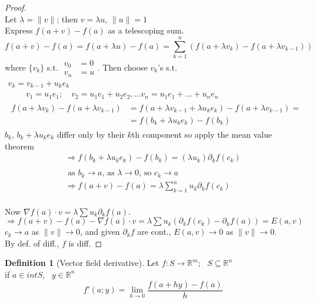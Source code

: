 \documentclass[twoside]{amsart}
\theoremstyle{plain}
\theoremstyle{definition}
\newtheorem{definition}{Definition}
\begin{document}
\begin{proof} \quad \\
Let $\lambda = \| v \|$; then $v = \lambda u$, \quad $\| u \| = 1$ \\
Express $f(a+v) -f(a)$ as a telescoping sum.  
\[
f(a+v)-f(a) = f(a + \lambda u ) -f(a) = \sum_{k=1}^n \left( f(a+\lambda v_k) - f(a+\lambda v_{k-1}) \right) 
\]
where $\{ v_k \}$ s.t. $  \begin{aligned}
    v_0 & = 0 \\
    v_n & = u 
  \end{aligned}$.  Then choose $v_k$'s s.t. 
\[
\begin{gathered}
  v_k = v_{k-1} + u_k e_k \\
 \quad \quad \, v_1 = u_1 e_1; \quad v_2 = u_1 e_1 + u_2 e_2 , \dots v_n = u_1 e_1 + \dots + u_n e_n  \\
  \begin{aligned}
f(a+\lambda v_k) - f(a+\lambda v_{k-1} )  & = f(a+ \lambda v_{k-1} + \lambda u_k e_k) - f(a+\lambda v_{k-1} ) = \\
& = f(b_k + \lambda u_k e_k) - f(b_k)
\end{aligned} 
\end{gathered}
\]
$b_k, \, b_k + \lambda u_k e_k$ differ only by their $k$th component so apply the mean value theorem 
\[
\begin{gathered}
  \Longrightarrow f(b_k + \lambda u_k e_k) - f(b_k) = (\lambda u_k) \partial_k f(c_k) \\
\quad \\
\text{ as $b_k \to a$, as $\lambda \to 0$, so $c_k \to a$ } \\
\Longrightarrow f(a+v) -f(a) = \lambda \sum_{k=1}^n u_k \partial_k f(c_k) 
\end{gathered}
\]
\quad \\
Now $\nabla f(a) \cdot v = \lambda \sum u_k \partial_k f(a) $.  \\
$\Longrightarrow f(a+v) -f(a) - \nabla f(a) \cdot v = \lambda \sum u_k (\partial_k f(c_k) - \partial_k f(a) ) = E(a,v)$ \medskip \\
$c_k \to a$ as $\| v \| \to 0$, and given $\partial_k f$ are cont., $E(a,v) \to 0$ as $\| v \| \to 0$.  \\
By def. of diff., $f$ is diff.  
\end{proof}

\begin{definition}[Vector field derivative] Let $f: S \to \mathbb{R}^m$; \, $S \subseteq \mathbb{R}^n$ \\
  if $a \in int{S}$, \, $y \in \mathbb{R}^n$ 
\begin{equation}
  f'(a;y) = \lim_{h\to 0} \frac{ f(a+hy) - f(a) }{h} 
\end{equation}
\end{definition}
\end{document}
